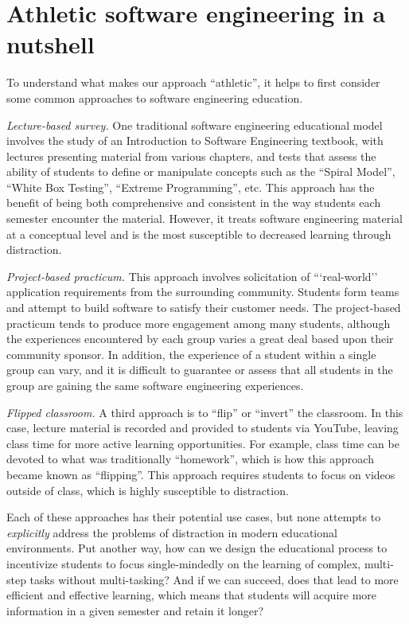 \section{Athletic software engineering in a nutshell}

To understand what makes our approach ``athletic'', it helps to first consider some common approaches to software engineering education. 

{\em Lecture-based survey.}  One traditional software engineering educational model involves the study of an Introduction to Software Engineering textbook, with lectures presenting material from various chapters, and tests that assess the ability of students to define or manipulate concepts such as the ``Spiral Model'', ``White Box Testing'', ``Extreme Programming'', etc. This approach has the benefit of being both comprehensive and consistent in the way students each semester encounter the material. However, it treats software engineering material at a conceptual level and is the most susceptible to decreased learning through distraction.

{\em Project-based practicum.}  This approach involves solicitation of ```real-world'' application requirements from the surrounding community.  Students form teams and attempt to build software to satisfy their customer needs.  The project-based practicum tends to produce more engagement among many students, although the experiences encountered by each group varies a great deal based upon their community sponsor. In addition, the experience of a student within a single group can vary, and it is difficult to guarantee or assess that all students in the group are gaining the same software engineering experiences. 

{\em Flipped classroom.}  A third approach is to ``flip'' or ``invert'' the classroom. In this case, lecture material is recorded and provided to students via YouTube, leaving class time for more active learning opportunities. For example, class time can be devoted to what was traditionally ``homework'', which is how this approach became known as ``flipping''.  This approach requires students to focus on videos outside of class, which is highly susceptible to distraction.

Each of these approaches has their potential use cases, but none attempts to {\em explicitly} address the problems of distraction in modern educational environments. Put another way, how can we design the educational process to incentivize students to focus single-mindedly on the learning of complex, multi-step tasks without multi-tasking?  And if we can succeed, does that lead to more efficient and effective learning, which means that students will acquire more information in a given semester and retain it longer? 

